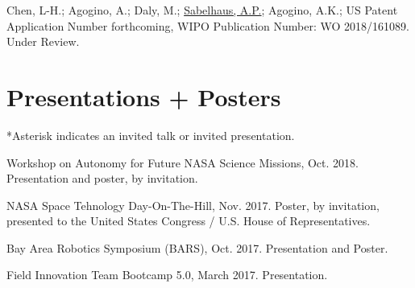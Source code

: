 \documentclass[letterpaper]{deedy-resume} %
\begin{document}
{\begin{etaremune}
\item {} Chen, L-H.; Agogino, A.; Daly, M.; \underline{Sabelhaus, A.P.}; Agogino, A.K.; US Patent Application Number forthcoming, WIPO Publication Number: WO 2018/161089. Under Review.

\end{etaremune}



\section{Presentations + Posters}

\vspace{0.1cm}


*Asterisk indicates an invited talk or invited presentation.


\begin{etaremune}
  

\item {\Large{\textasteriskcentered}} {} Workshop on Autonomy for Future NASA Science Missions, Oct. 2018. Presentation and poster, by invitation.
  
\item {\Large{\textasteriskcentered}} {} NASA Space Tehnology Day-On-The-Hill, Nov. 2017. Poster, by invitation, presented to the United States Congress / U.S. House of Representatives.

\item {} Bay Area Robotics Symposium (BARS), Oct. 2017. Presentation and Poster.

\item {} Field Innovation Team Bootcamp 5.0, March 2017. Presentation.


\end{etaremune}}
\end{document}

